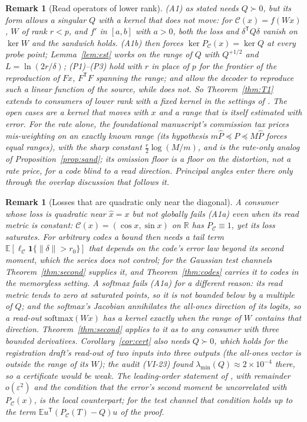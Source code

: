 \documentclass[11pt,onecolumn]{IEEEtran}
\newtheorem{remark}[theorem]{Remark}
\newcommand{\E}{\mathbb{E}}
\newcommand{\R}{\mathbb{R}}
\newcommand{\PC}{P_{\mathcal C}}
\newcommand{\lmin}{\lambda_{\min}}
\begin{document}
\begin{remark}[Read operators of lower rank]
(A1) as stated needs $Q\succ0$, but its form allows a singular $Q$ with a
kernel that does not move: for $\mathcal C(x)=f(Wx)$, $W$ of rank $r<p$, and $f'$
in $[a,b]$ with $a>0$, both the loss and $\delta^{\mathsf T}Q\delta$ vanish on
$\ker W$ and the sandwich holds. (A1b) then forces
$\ker\PC(x)=\ker Q$ at every probe point; Lemma~\ref{lem:est} works on the
range of $Q$ with $Q^{+1/2}$ and $L=\ln(2r/\delta)$; (P1)--(P3) hold with
$r$ in place of $p$ for the frontier of the reproduction of $Fx$,
$F^{\mathsf T}F$ spanning the range; and \cite{part1,part2,part3} allow the
decoder to reproduce such a linear function of the source, while
\cite{part4} does not. So Theorem~\ref{thm:T1} extends to consumers of lower rank
with a fixed kernel in the settings of \cite{part1,part2,part3}. The open
cases are a kernel that moves with $x$ and a range that is itself estimated
with error. For the rate alone, the foundational manuscript's commission tax
\cite{otieee} prices mis-weighting on an exactly known range (its hypothesis
$m\hat P\preceq P\preceq M\hat P$ forces equal ranges), with the sharp constant
$\tfrac r2\log(M/m)$, and is the rate-only analog of Proposition~\ref{prop:sand};
its omission floor is a floor on the distortion, not a rate price, for a
code blind to a read direction. Principal angles enter there only through
the overlap discussion that follows it.
\end{remark}

\begin{remark}[Losses that are quadratic only near the diagonal]
A consumer whose loss is quadratic near $\hat x=x$ but not globally fails (A1a) even
when its read metric is constant: $\mathcal C(x)=(\cos x,\sin x)$ on $\R$ has
$\PC\equiv1$, yet its loss saturates. For arbitrary codes a bound then needs a tail
term $\E[\ell_{\mathcal C}\mathbf 1\{\|\delta\|>r_0\}]$ that depends on the code's error
law beyond its second moment, which the series does not control; for the Gaussian
test channels Theorem~\ref{thm:second} supplies it, and Theorem~\ref{thm:codes} carries
it to codes in the memoryless setting. A softmax fails (A1a) for a different reason: its
read metric tends to zero at saturated points, so it is not bounded below by a multiple
of $Q$; and the softmax's Jacobian annihilates the all-ones direction of its logits, so
a read-out $\mathrm{softmax}(Wx)$ has a kernel exactly when the range of $W$ contains
that direction. Theorem~\ref{thm:second} applies to it as to any consumer with three
bounded derivatives. Corollary~\ref{cor:cert} also needs $Q\succ0$, which holds for the
registration draft's read-out of two inputs into three outputs (the all-ones vector is
outside the range of its $W$); the audit (VI-23) found $\lmin(Q)\approx2\times10^{-4}$
there, so a certificate would be weak. The leading-order statement of
\cite[Prop.~1]{otieee}, with remainder $o(\varepsilon^2)$ and the condition that the
error's second moment be uncorrelated with $\PC(x)$, is the local counterpart; for
the test channel that condition holds up to the term $\E u^{\mathsf T}(\PC(T)-Q)u$
of the proof.
\end{remark}
\end{document}
